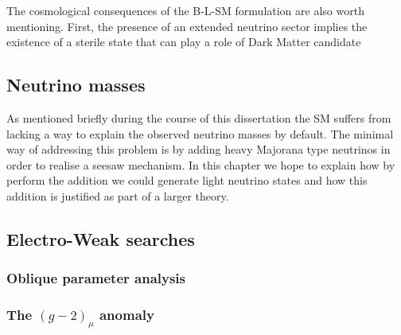   
The cosmological consequences of the B-L-SM formulation are also worth mentioning.  First, the presence of an extended neutrino sector implies the existence of a sterile state that can play a role of Dark Matter candidate 

\subsection{Neutrino masses}

As mentioned briefly during the course of this dissertation the SM suffers from lacking a way to explain the observed neutrino masses by default. The minimal way of addressing this problem is by adding heavy Majorana type neutrinos in order to realise a seesaw mechanism. In this chapter we hope to explain how by perform the addition we could generate light neutrino states and how this addition is justified as part of a larger theory. 

 

 
\subsection{Electro-Weak searches}

\subsubsection{ Oblique parameter analysis }

\subsubsection{ The $( g - 2 )_\mu $ anomaly }

